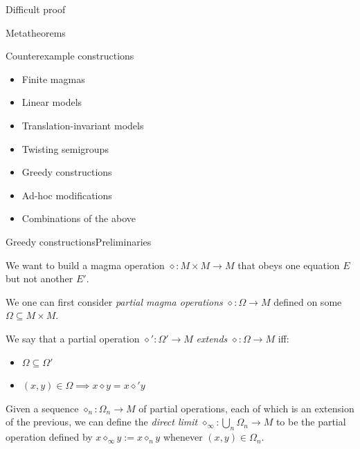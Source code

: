\documentclass{beamer}
\newcommand{\op}{\diamond}
\begin{document}
\begin{frame}{Difficult proof}
\end{frame}


\begin{frame}{Metatheorems}
\end{frame}


\begin{frame}{Counterexample constructions}

\begin{itemize}
	\item Finite magmas
	\item Linear models
	\item Translation-invariant models
	\item Twisting semigroups
	\item Greedy constructions
	\item Ad-hoc modifications
	\item Combinations of the above
\end{itemize}

\end{frame}


\begin{frame}{Greedy constructions}{Preliminaries}

We want to build a magma operation $\op \colon M \times M \to M$ that obeys one equation $E$ but not another $E'$.

We one can first consider \emph{partial magma operations} $\op \colon \Omega \to M$ defined on some  $\Omega \subseteq M \times M$.

We say that a partial operation $\op' \colon \Omega' \to M$ \emph{extends} $\op \colon \Omega \to M$ iff:\!
\begin{itemize}
	\item $\Omega \subseteq \Omega'$
	\item $(x, y) \in \Omega \implies x \op y = x \op' y$
\end{itemize}

Given a sequence $\op_n \colon \Omega_n \to M$ of partial operations, each of which is an extension of the previous, we can define the \emph{direct limit} $\op_\infty \colon \bigcup_n \Omega_n \to M$ to be the partial operation defined by $x \op_\infty y := x \op_n y$ whenever $(x,y) \in \Omega_n$.

\end{frame}
\end{document}
